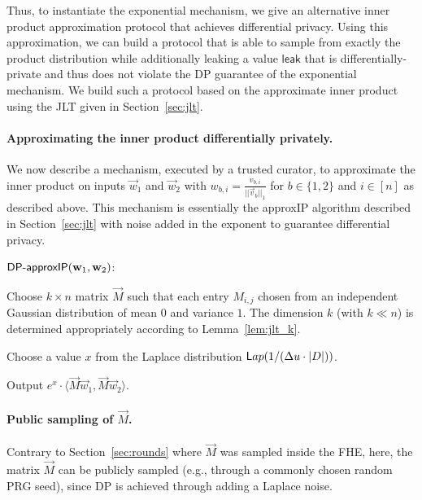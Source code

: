 Thus, to instantiate the exponential mechanism, we give an alternative
inner product approximation protocol that achieves differential privacy.
Using this approximation, we can build a protocol that is able to sample
from exactly the product distribution while additionally leaking a value
$\mathsf{leak}$ that is differentially-private and thus does not violate
the DP guarantee of the exponential mechanism.  
We build such a protocol based on the approximate inner product using
the JLT given in Section~\ref{sec:jlt}.

\paragraph{Approximating the inner product differentially privately.}
We now describe a mechanism, executed by a trusted curator, to
approximate the inner product on inputs $\vec{w}_1$ and $\vec{w}_2$ with
${w}_{b,i} = \frac{{v}_{b,i}}{||\vec{v}_b||_1}$ for $b \in \{1,2\}$ and
$i \in [n]$ as described above.  This mechanism is essentially the {\sf
approxIP} algorithm described in Section~\ref{sec:jlt} with noise added
in the exponent to guarantee differential privacy.

\BEN
\item[] \hspace{-2em} $\dIP(\w_1, \w_2)$: 
 
\item Choose $k \times n$ matrix $\vec{M}$ such that each entry
$M_{i,j}$ chosen from an independent Gaussian distribution of mean $0$
and variance $1$. The dimension $k$ (with $k \ll n$) is determined
appropriately according to Lemma~\ref{lem:jlt_k}.

\item Choose a value $x$ from the Laplace distribution ${\sf
Lap}(1/(\Delta u \cdot |D|))$. 

\item Output $e^x \cdot \langle \vec{M}\vec{w}_1, \vec{M}\vec{w}_2
\rangle$. 
\EEN

\paragraph{Public sampling of $\vec M$.}
Contrary to Section~\ref{sec:rounds} where $\vec M$ was sampled inside
the FHE, here, the matrix $\vec M$ can be publicly sampled (e.g.,
through a commonly chosen random PRG seed), since DP is achieved through
adding a Laplace noise. 


